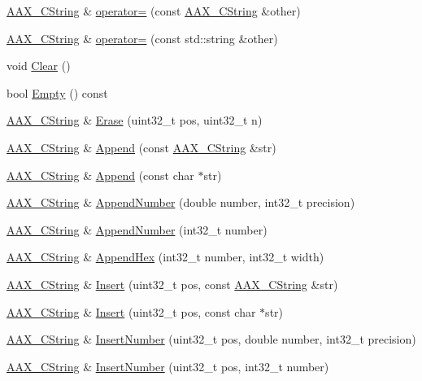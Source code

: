 \begin{DoxyCompactItemize}
\item 
\hyperlink{a00042}{A\+A\+X\+\_\+\+C\+String} \& \hyperlink{a00042_ae62cc4543c9ac4d8682176474c46d8d2}{operator=} (const \hyperlink{a00042}{A\+A\+X\+\_\+\+C\+String} \&other)
\item 
\hyperlink{a00042}{A\+A\+X\+\_\+\+C\+String} \& \hyperlink{a00042_ad6db6f32c710ef0897ca09cb8ff9f3be}{operator=} (const std\+::string \&other)
\item 
void \hyperlink{a00042_a866d456c7cad181d1feda559a0ca3d07}{Clear} ()
\item 
bool \hyperlink{a00042_acade83c65b1324c7aaee835c7d54642d}{Empty} () const 
\item 
\hyperlink{a00042}{A\+A\+X\+\_\+\+C\+String} \& \hyperlink{a00042_a78ab9164c3b4aa17d13191fc7ea14fc0}{Erase} (uint32\+\_\+t pos, uint32\+\_\+t n)
\item 
\hyperlink{a00042}{A\+A\+X\+\_\+\+C\+String} \& \hyperlink{a00042_a53b726507fec5a24ffb46e9af194a958}{Append} (const \hyperlink{a00042}{A\+A\+X\+\_\+\+C\+String} \&str)
\item 
\hyperlink{a00042}{A\+A\+X\+\_\+\+C\+String} \& \hyperlink{a00042_a6ed6be18fcfa25acfeb7967e282d9fa8}{Append} (const char $\ast$str)
\item 
\hyperlink{a00042}{A\+A\+X\+\_\+\+C\+String} \& \hyperlink{a00042_a3b04d5d9e161a75be5bfe71cfb15d4dc}{Append\+Number} (double number, int32\+\_\+t precision)
\item 
\hyperlink{a00042}{A\+A\+X\+\_\+\+C\+String} \& \hyperlink{a00042_a786e1ba24a2b7a893d1716884e887ef2}{Append\+Number} (int32\+\_\+t number)
\item 
\hyperlink{a00042}{A\+A\+X\+\_\+\+C\+String} \& \hyperlink{a00042_a245305cf7cea6f5ba710bdbf7803b535}{Append\+Hex} (int32\+\_\+t number, int32\+\_\+t width)
\item 
\hyperlink{a00042}{A\+A\+X\+\_\+\+C\+String} \& \hyperlink{a00042_ac75c6fa9a9feca688723726752e276ef}{Insert} (uint32\+\_\+t pos, const \hyperlink{a00042}{A\+A\+X\+\_\+\+C\+String} \&str)
\item 
\hyperlink{a00042}{A\+A\+X\+\_\+\+C\+String} \& \hyperlink{a00042_a5a5feb73f4187fddc7da0d1d8d821468}{Insert} (uint32\+\_\+t pos, const char $\ast$str)
\item 
\hyperlink{a00042}{A\+A\+X\+\_\+\+C\+String} \& \hyperlink{a00042_a4657b3b7b319a76dc6e0a2c0fd9f15f1}{Insert\+Number} (uint32\+\_\+t pos, double number, int32\+\_\+t precision)
\item 
\hyperlink{a00042}{A\+A\+X\+\_\+\+C\+String} \& \hyperlink{a00042_a75f4b0d92de2f70405a115ff32546d99}{Insert\+Number} (uint32\+\_\+t pos, int32\+\_\+t number)

\end{DoxyCompactItemize}
